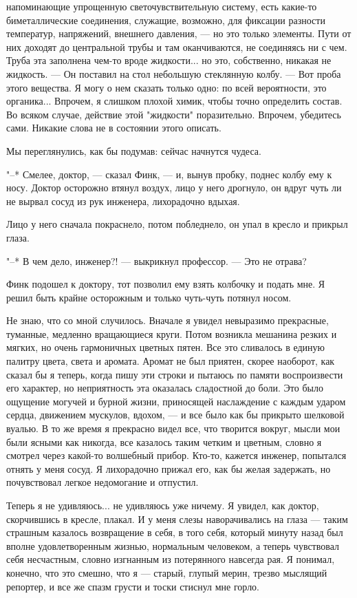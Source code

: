 напоминающие  упрощенную  светочувствительную   систему,   есть   какие-то
биметаллические соединения,  служащие,  возможно,  для  фиксации  разности
температур, напряжений, внешнего давления, --- но это только элементы.  Пути
от них доходят до центральной трубы и там оканчиваются, не соединяясь ни с
чем. Труба эта заполнена чем-то  вроде  жидкости...  но  это,  собственно,
никакая не жидкость. --- Он поставил на стол небольшую стеклянную  колбу.  ---
Вот проба этого вещества. Я могу  о  нем  сказать  только  одно:  по  всей
вероятности, это органика... Впрочем, я слишком плохой химик, чтобы  точно
определить  состав.   Во   всяком   случае,   действие   этой   "жидкости"
поразительно. Впрочем, убедитесь сами. Никакие слова не в состоянии  этого
описать.

Мы переглянулись, как бы подумав: сейчас начнутся чудеса.

"--* Смелее, доктор, --- сказал Финк, --- и, вынув пробку, поднес колбу ему  к
носу. Доктор осторожно втянул воздух, лицо у него дрогнуло, он вдруг  чуть
ли не вырвал сосуд из рук инженера, лихорадочно вдыхая.

Лицо у него сначала покраснело, потом побледнело, он упал  в  кресло  и
прикрыл глаза.

"--* В чем дело, инженер?! --- выкрикнул профессор. --- Это не отрава?

Финк подошел к доктору, тот позволил ему взять колбочку и подать мне. Я
решил быть крайне осторожным и только чуть-чуть потянул носом.

Не знаю, что со мной случилось. Вначале я увидел невыразимо прекрасные,
туманные, медленно вращающиеся круги. Потом  возникла  мешанина  резких  и
мягких, но очень гармоничных цветных пятен. Все  это  сливалось  в  единую
палитру цвета, света и аромата. Аромат не был  приятен,  скорее  наоборот,
как сказал бы я  теперь,  когда  пишу  эти  строки  и  пытаюсь  по  памяти
воспроизвести его характер, но неприятность эта  оказалась  сладостной  до
боли. Это было ощущение могучей и бурной жизни, приносящей  наслаждение  с
каждым ударом сердца, движением мускулов, вдохом, ---  и  все  было  как  бы
прикрыто шелковой вуалью. В  то  же  время  я  прекрасно  видел  все,  что
творится вокруг, мысли мои были ясными как  никогда,  все  казалось  таким
четким и цветным,  словно  я  смотрел  через  какой-то  волшебный  прибор.
Кто-то, кажется инженер, попытался отнять  у  меня  сосуд.  Я  лихорадочно
прижал его, как бы желая задержать, но почувствовал легкое  недомогание  и
отпустил.

Теперь я не удивляюсь... не удивляюсь уже ничему. Я увидел, как доктор,
скорчившись в кресле, плакал. И у меня слезы  наворачивались  на  глаза  ---
таким страшным казалось возвращение в себя, в того  себя,  который  минуту
назад был вполне удовлетворенным жизнью, нормальным  человеком,  а  теперь
чувствовал себя несчастным, словно изгнанным из потерянного навсегда  рая.
Я понимал, конечно, что это смешно, что я --- старый, глупый  мерин,  трезво
мыслящий репортер, и все же спазм грусти и тоски стиснул мне горло.

